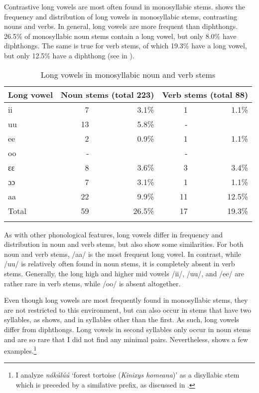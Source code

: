 Contrastive long vowels are most often found in monosyllabic stems.  shows the frequency and distribution of long vowels in monosyllabic stems, contrasting nouns and verbs. In general, long vowels are more frequent than diphthongs. 26.5\% of monosyllabic noun stems contain a long vowel, but only 8.0\% have diphthongs. The same is true for verb stems, of which 19.3\% have a long vowel, but only 12.5\% have a diphthong (see  in ). 

\begin{table}
\begin{tabularx}{\textwidth}{X rrrr}
\lsptoprule
Long vowel& \multicolumn{2}{c}{Noun stems  (total 223)} & \multicolumn{2}{c}{Verb stems  (total 88)} \\  \midrule
ii		 & 	7 & 3.1\%	& 	1 & 1.1\%  \\
uu		& 	13 & 5.8\%	& 	-  \\
ee		& 	2   & 0.9\%    & 	1 & 1.1\%  \\
oo	        & 	 -	& &	-  \\
ɛɛ            &       8  & 3.6\%    &     3  & 3.4\% \\
ɔɔ            &        7   & 3.1\%  &      1 & 1.1\%  \\
aa            &        22  & 9.9\%    &    11   & 12.5\%   \\  \midrule
Total       &        59   & 26.5\%   &     17 & 19.3\%  \\
\lspbottomrule
\end{tabularx}
\caption{Long vowels in monosyllabic noun and verb stems}
\label{Tab:VLength}
\end{table}

As with other phonological features, long vowels differ in frequency and distribution in noun and verb stems, but also show some similarities. For both noun and verb stems, /aa/ is the most frequent long vowel. In contrast, while /uu/ is relatively often found in noun stems, it is completely absent in verb stems. Generally, the long high and higher mid vowels /ii/, /uu/, and /ee/ are rather rare in verb stems, while /oo/  is absent altogether.

Even though long vowels are most frequently found in monosyllabic stems, they are not restricted to this environment, but can also occur in stems that have two syllables, as  shows, and in syllables other than the first. As such, long vowels differ from diphthongs. Long vowels in second syllables only occur in noun stems and are so rare that I did not find any minimal pairs. Nevertheless,  shows a few examples.\footnote{I analyze {\itshape nákúlúú} `forest tortoise ({\itshape Kinixys homeana})' as a disyllabic stem which is preceded by a similative prefix, as discussed in .}

